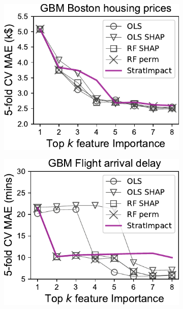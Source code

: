 \documentclass[twoside,11pt]{article}
\begin{document}
\begin{figure}
\centering
\begin{subfigure}{.24\textwidth}
    \centering
\includegraphics[scale=0.48]{images/boston-topk-GBM-Importance.pdf}
\end{subfigure}%
\hfill
\begin{subfigure}{.23\textwidth}
    \centering
\includegraphics[scale=0.48]{images/flights-topk-GBM-Importance.pdf}
\end{subfigure}
\hfill
\begin{subfigure}{.25\textwidth}

\end{subfigure}
\end{figure}
\end{document}
